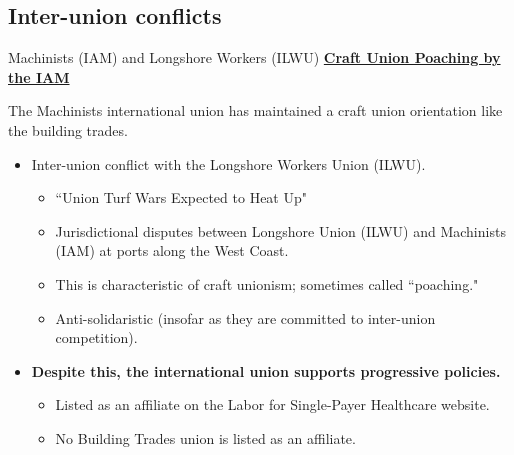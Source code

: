\documentclass{beamer}
\begin{document}
\subsection*{Inter-union conflicts}
\begin{frame}{Machinists (IAM) and Longshore Workers (ILWU)}
\underline{\textbf{Craft Union Poaching by the IAM}}\newline

The Machinists international union has maintained a craft union orientation like the building trades.
	\begin{itemize}
		\item Inter-union conflict with the Longshore Workers Union (ILWU).
		\begin{itemize}
			\item ``Union Turf Wars Expected to Heat Up" %
			\item Jurisdictional disputes between Longshore Union (ILWU) and Machinists (IAM) at ports along the West Coast.
			\item This is characteristic of craft unionism; sometimes called ``poaching."
			\item Anti-solidaristic (insofar as they are committed to inter-union competition).
		\end{itemize}
	\item \textbf{Despite this, the international union supports progressive policies.}
		\begin{itemize}
			\item Listed as an affiliate on the Labor for Single-Payer Healthcare website.
			\item No Building Trades union is listed as an affiliate.
		\end{itemize}
	\end{itemize}
\end{frame}
	
\end{document}
